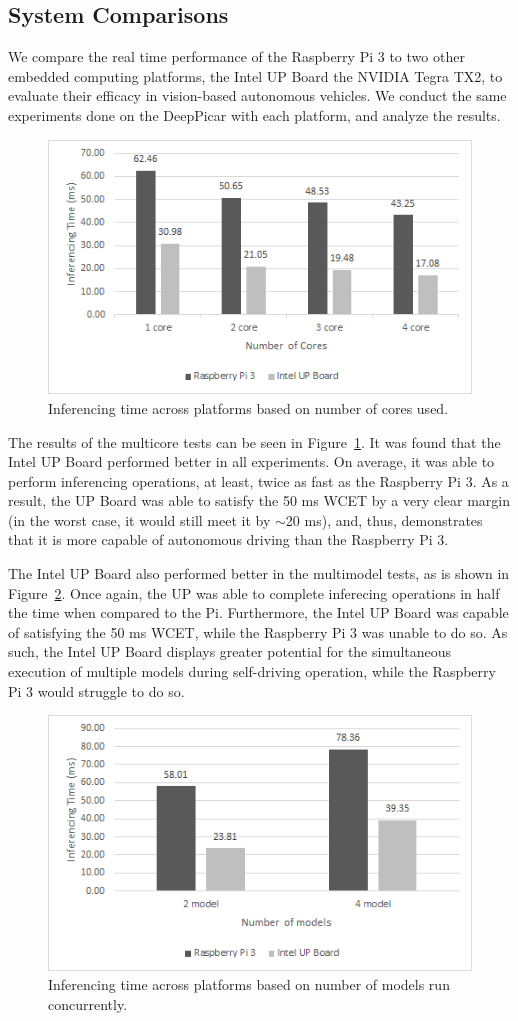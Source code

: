 \subsection{System Comparisons}
We compare the real time performance of the Raspberry Pi 3 to two other embedded computing platforms, 
the Intel UP Board the NVIDIA Tegra TX2, to evaluate their efficacy in vision-based autonomous 
vehicles. We conduct the same experiments done on the DeepPicar with each platform, and analyze the 
results.

\begin{figure}[h]
  \centering
  \includegraphics[width=.5\textwidth]{figs/system_multicore}
  \caption{Inferencing time across platforms based on number of cores used.}
  \label{fig:sys_core}
\end{figure}

The results of the multicore tests can be seen in Figure~\ref{fig:sys_core}. It was found that the 
Intel UP Board performed better in all experiments. On average, it was able to perform inferencing 
operations, at least, twice as fast as the Raspberry Pi 3. As a result, the UP Board was able to 
satisfy the 50 ms WCET by a very clear margin (in the worst case, it would still meet it by $\sim$20 
ms), and, thus, demonstrates that it is more capable of autonomous driving than the Raspberry Pi 3.

The Intel UP Board also performed better in the multimodel tests, as is shown in 
Figure~\ref{fig:sys_model}. Once again, the UP was able to complete inferecing operations in half the 
time when compared to the Pi. Furthermore, the Intel UP Board was capable of satisfying the 50 ms 
WCET, while the Raspberry Pi 3 was unable to do so. As such, the Intel UP Board displays greater 
potential for the simultaneous execution of multiple models during self-driving operation, while the 
Raspberry Pi 3 would struggle to do so.

\begin{figure}[h]
  \centering
  \includegraphics[width=.5\textwidth]{figs/system_multimodel}
  \caption{Inferencing time across platforms based on number of models run concurrently.}
  \label{fig:sys_model}
\end{figure}

